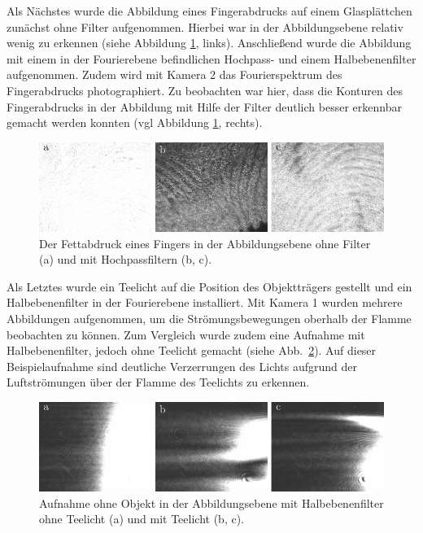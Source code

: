 Als Nächstes wurde die Abbildung eines Fingerabdrucks auf einem Glasplättchen zunächst ohne Filter aufgenommen. Hierbei war in der Abbildungsebene relativ wenig zu erkennen (siehe Abbildung \ref{fig:example20_Hochpass}, links). Anschließend wurde die Abbildung mit einem in der Fourierebene befindlichen Hochpass- und einem Halbebenenfilter aufgenommen. Zudem wird mit Kamera 2 das Fourierspektrum des Fingerabdrucks photographiert. Zu beobachten war hier, dass die Konturen des Fingerabdrucks in der Abbildung mit Hilfe der Filter deutlich besser erkennbar gemacht werden konnten (vgl Abbildung \ref{fig:example20_Hochpass}, rechts).\\


\begin{figure}[h]
	\centering
	\includegraphics{images/ergebniss_Fingerab/abb.pdf}
	\caption{
		Der Fettabdruck eines Fingers in der Abbildungsebene ohne Filter (a) und mit Hochpassfiltern (b, c).
	}
	\label{fig:example20_Hochpass}
\end{figure}

Als Letztes wurde ein Teelicht auf die Position des Objektträgers gestellt und ein Halbebenenfilter in der Fourierebene installiert. Mit Kamera 1 wurden mehrere Abbildungen aufgenommen, um die Strömungsbewegungen oberhalb der Flamme beobachten zu können. Zum Vergleich wurde zudem eine Aufnahme mit Halbebenenfilter, jedoch ohne Teelicht gemacht (siehe Abb.~\ref{fig:Halbebenenfilter_mit_und_ohne_Teelicht}). Auf dieser Beispielaufnahme sind deutliche Verzerrungen des Lichts aufgrund der Luftströmungen über der Flamme des Teelichts zu erkennen. 

\begin{figure}[h]
	\centering
	\includegraphics{images/ergebniss_Teelicht/abb.pdf}
	\caption[Schlieren]{
		Aufnahme ohne Objekt in der Abbildungsebene mit Halbebenenfilter ohne Teelicht (a) und mit Teelicht (b, c).
	}
	\label{fig:Halbebenenfilter_mit_und_ohne_Teelicht}
\end{figure}


